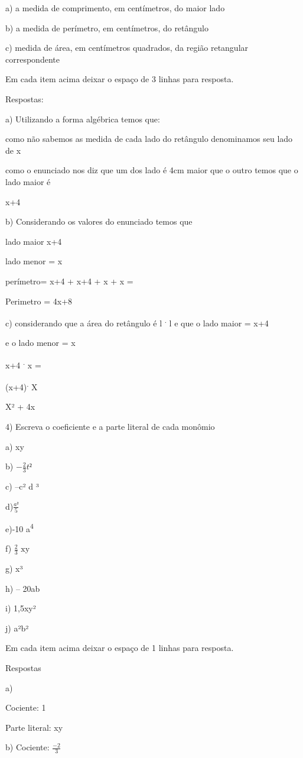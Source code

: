 a) a medida de comprimento, em centímetros, do maior lado

b) a medida de perímetro, em centímetros, do retângulo

c) medida de área, em centímetros quadrados, da região retangular
correspondente

Em cada item acima deixar o espaço de 3 linhas para resposta.

Respostas:

a) Utilizando a forma algébrica temos que:

como não sabemos as medida de cada lado do retângulo denominamos seu
lado de x

como o enunciado nos diz que um dos lado é 4cm maior que o outro temos
que o lado maior é

x+4

b) Considerando os valores do enunciado temos que

lado maior x+4

lado menor = x

perímetro= x+4 + x+4 + x + x =

Perimetro = 4x+8

c) considerando que a área do retângulo é l \textsuperscript{.} l e que
o lado maior = x+4

e o lado menor = x

x+4 \textsuperscript{.} x =

(x+4)\textsuperscript{.} X

X² + 4x

4) Escreva o coeficiente e a parte literal de cada monômio

a) xy

b) \(- \frac{2}{3}t²\)

c) --c² d ³

d)\(\frac{a²}{5}\)

e)-10 a\textsuperscript{4}

f) \(\frac{2}{3}\text{\ xy}\)

g) x³

h) -- 20ab

i) 1,5xy²

j) a²b²

Em cada item acima deixar o espaço de 1 linhas para resposta.

Respostas

a)

Cociente: 1

Parte literal: xy

b) Cociente: \(\frac{- 2}{3}\)


